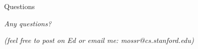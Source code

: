 \begin{frame}[fragile]{Questions}

\begin{center}
    {\LARGE \color{cardinal}\textit{Any questions?}}
\end{center}

\begin{center}
    {\small \textit{(feel free to post on Ed or email me: mossr@cs.stanford.edu)}}
\end{center}

\end{frame}